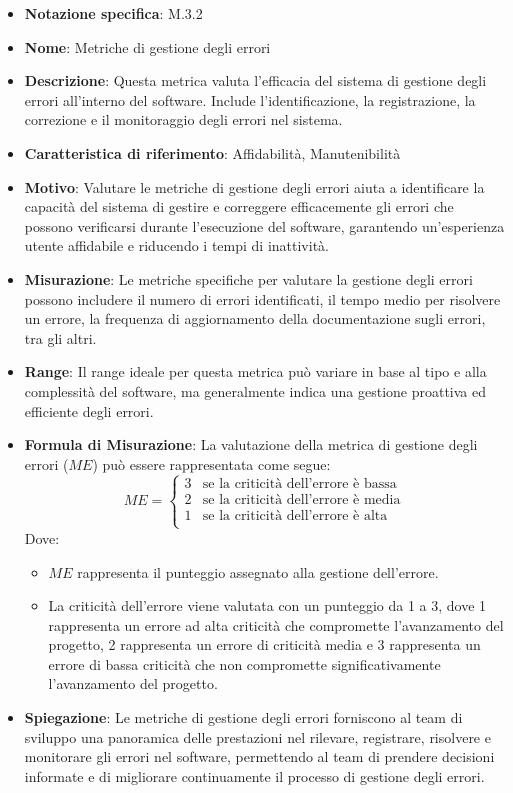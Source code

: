 \begin{itemize}
    \item \textbf{Notazione specifica}: M.3.2
    \item \textbf{Nome}: Metriche di gestione degli errori
    \item \textbf{Descrizione}: Questa metrica valuta l'efficacia del sistema di gestione degli errori all'interno del software. Include l'identificazione, la registrazione, la correzione e il monitoraggio degli errori nel sistema.
    \item \textbf{Caratteristica di riferimento}: Affidabilità, Manutenibilità
    \item \textbf{Motivo}: Valutare le metriche di gestione degli errori aiuta a identificare la capacità del sistema di gestire e correggere efficacemente gli errori che possono verificarsi durante l'esecuzione del software, garantendo un'esperienza utente affidabile e riducendo i tempi di inattività.
    \item \textbf{Misurazione}: Le metriche specifiche per valutare la gestione degli errori possono includere il numero di errori identificati, il tempo medio per risolvere un errore, la frequenza di aggiornamento della documentazione sugli errori, tra gli altri.
    \item \textbf{Range}: Il range ideale per questa metrica può variare in base al tipo e alla complessità del software, ma generalmente indica una gestione proattiva ed efficiente degli errori.
    \item \textbf{Formula di Misurazione}: La valutazione della metrica di gestione degli errori (\( ME \)) può essere rappresentata come segue:
    \[
    ME = \begin{cases} 
          3 & \text{se la criticità dell'errore è bassa} \\
          2 & \text{se la criticità dell'errore è media} \\
          1 & \text{se la criticità dell'errore è alta} \\
       \end{cases}
    \]
    Dove:
    \begin{itemize}
        \item \( ME \) rappresenta il punteggio assegnato alla gestione dell'errore.
        \item La criticità dell'errore viene valutata con un punteggio da 1 a 3, dove 1 rappresenta un errore ad alta criticità che compromette l'avanzamento del progetto, 2 rappresenta un errore di criticità media e 3 rappresenta un errore di bassa criticità che non compromette significativamente l'avanzamento del progetto.
    \end{itemize}
    \item \textbf{Spiegazione}: Le metriche di gestione degli errori forniscono al team di sviluppo una panoramica delle prestazioni nel rilevare, registrare, risolvere e monitorare gli errori nel software, permettendo al team di prendere decisioni informate e di migliorare continuamente il processo di gestione degli errori.
\end{itemize}


